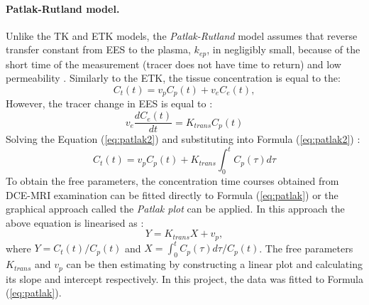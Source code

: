 \paragraph{Patlak-Rutland model.}
Unlike the TK and ETK models, the \textit{Patlak-Rutland} model \cite{patlak1983graphical} assumes that reverse transfer constant from EES to the plasma, $k_{ep}$, in negligibly small, because of the short time of the measurement (tracer does not have time to return) and low permeability \cite{khalifa2014models}. 
Similarly to the ETK, the tissue concentration is equal to the:
\begin{equation}
C_t(t) = v_pC_p(t) + v_eC_e(t),
\label{eq:patlak1}
\end{equation}
\newpage
\noindent However, the tracer change in EES is equal to \cite{thesis,patlak1983graphical}: 
\begin{equation}
	\label{eq:patlak2}
	v_e\frac{dC_{e}(t)}{dt} = K_{trans}C_p(t)
\end{equation}
Solving the Equation (\ref{eq:patlak2}) and substituting into Formula (\ref{eq:patlak2}) \cite{khalifa2014models, patlak1983graphical}: 
\begin{equation}
	\label{eq:patlak}
	C_{t}(t) =v_pC_p(t) + K_{trans}\int_{0}^{t}C_p(\tau)d\tau  
\end{equation}
To obtain the free parameters, the concentration time courses obtained from DCE-MRI examination can be fitted directly to Formula (\ref{eq:patlak}) or the graphical approach called the \textit{Patlak plot} can be applied. In this approach the above equation is linearised as \cite{khalifa2014models, patlak1983graphical}:  
\begin{equation}
	\label{eq:patlak_lin}
	Y = K_{trans}X +v_p,  
\end{equation}
where $Y=C_t(t)/C_p(t)$ and $X=\int_{0}^{t}C_p(\tau)d\tau/C_p(t)$. The free parameters $K_{trans}$ and $v_p$ can be then estimating by constructing a linear plot and calculating its slope and intercept respectively.
In this project, the data was fitted to Formula (\ref{eq:patlak}). 

